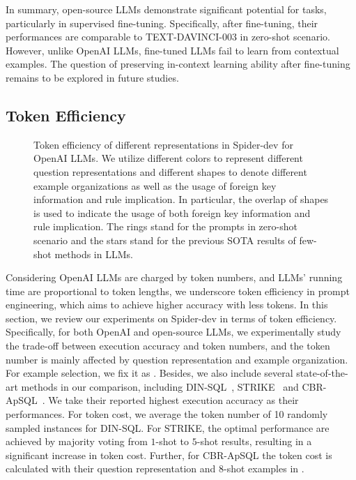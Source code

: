 In summary, open-source LLMs demonstrate significant potential for \nlsql tasks, particularly in supervised fine-tuning. 
Specifically, after fine-tuning, their performances are comparable to TEXT-DAVINCI-003 in zero-shot scenario. 
However, unlike OpenAI LLMs, fine-tuned LLMs fail to learn from contextual examples. 
The question of preserving in-context learning ability after fine-tuning remains to be explored in future studies.\subsection{Token Efficiency}
\label{subsec:summary}

\begin{figure*}[t]
    \centering
    \hfil
    \caption{Token efficiency of different representations in Spider-dev for OpenAI LLMs. We utilize different colors to represent different question representations and different shapes to denote different example organizations as well as the usage of foreign key information and rule implication. In particular, the overlap of shapes is used to indicate the usage of both foreign key information and rule implication. The rings stand for the prompts in zero-shot scenario and the stars stand for the previous SOTA results of few-shot methods in LLMs.}
    \label{fig:token_efficiency:icl}
\end{figure*}

Considering OpenAI LLMs are charged by token numbers, and LLMs' running time are proportional to token lengths, we underscore token efficiency in prompt engineering, which aims to achieve higher accuracy with less tokens. 
In this section, we review our experiments on Spider-dev in terms of token efficiency.   
Specifically, for both OpenAI and open-source LLMs, we experimentally study the trade-off between execution accuracy and token numbers, and the token number is mainly affected by question representation and example organization. 
For example selection, we fix it as \abpqsselector.
Besides, we also include several state-of-the-art \nlsql methods in our comparison, including DIN-SQL~\cite{din-sql}, STRIKE~\cite{enhancing} and CBR-ApSQL~\cite{DBLP:journals/corr/abs-2304-13301}. 
We take their reported highest execution accuracy as their performances. 
For token cost, we average the token number of 10 randomly sampled instances for DIN-SQL. 
For STRIKE, the optimal performance are achieved by majority voting from $1$-shot to $5$-shot results, resulting in a significant increase in token cost.
Further, for CBR-ApSQL the token cost is calculated with their question representation and $8$-shot examples in \sqlorg. 

